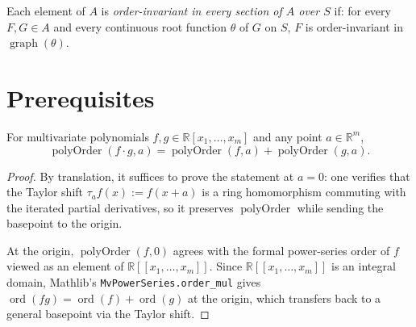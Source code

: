 \begin{definition}
  \label{def:OrderInvariantInAllSections}
  \leanok
  Each element of $A$ is \emph{order-invariant in every section of $A$ over $S$}
  if: for every $F, G \in A$ and every continuous root function $\theta$ of $G$
  on $S$, $F$ is order-invariant in $\operatorname{graph}(\theta)$.
\end{definition}

\section{Prerequisites}

\begin{lemma}
  \label{lem:polyOrder_mul_add}
  \leanok
  For multivariate polynomials $f, g \in \mathbb{R}[x_1, \ldots, x_m]$ and any
  point $a \in \mathbb{R}^m$,
  \[
    \operatorname{polyOrder}(f \cdot g, a)
      = \operatorname{polyOrder}(f, a) + \operatorname{polyOrder}(g, a).
  \]
\end{lemma}
\begin{proof}
  \leanok
  By translation, it suffices to prove the statement at $a = 0$: one verifies
  that the Taylor shift $\tau_a f(x) := f(x + a)$ is a ring homomorphism
  commuting with the iterated partial derivatives, so it preserves
  $\operatorname{polyOrder}$ while sending the basepoint to the origin.

  At the origin, $\operatorname{polyOrder}(f, 0)$ agrees with the formal
  power-series order of $f$ viewed as an element of
  $\mathbb{R}[\![x_1, \ldots, x_m]\!]$.  Since
  $\mathbb{R}[\![x_1, \ldots, x_m]\!]$ is an integral domain,
  Mathlib's \texttt{MvPowerSeries.order\_mul} gives
  $\operatorname{ord}(fg) = \operatorname{ord}(f) + \operatorname{ord}(g)$ at the
  origin, which transfers back to a general basepoint via the Taylor shift.
\end{proof}

